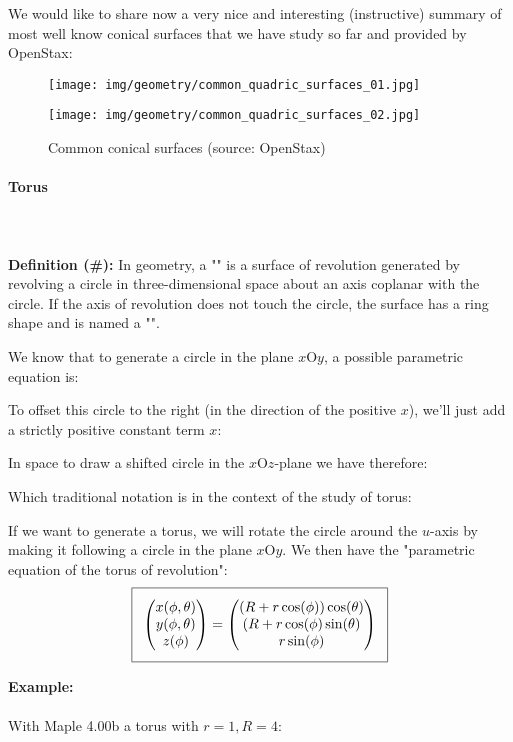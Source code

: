 {	We would like to share now a very nice and interesting (instructive) summary of most well know conical surfaces that we have study so far and provided by OpenStax:
	\begin{figure}[H]
		\centering
		\texttt{[image: img/geometry/common\_quadric\_surfaces\_01.jpg]}
	\end{figure}
	\begin{figure}[H]
		\centering
		\texttt{[image: img/geometry/common\_quadric\_surfaces\_02.jpg]}
		\caption[Common conical surfaces]{Common conical surfaces (source: OpenStax)}
	\end{figure}
	\pagebreak
	\paragraph{Torus}\mbox{}\\\\
	\textbf{Definition (\#\mydef):} In geometry, a "\label{torus}" is a surface of revolution generated by revolving a circle in three-dimensional space about an axis coplanar with the circle. If the axis of revolution does not touch the circle, the surface has a ring shape and is named a "".
	
	We know that to generate a circle in the plane $x\text{O}y$, a possible parametric equation is:
	
	To offset this circle to the right (in the direction of the positive $x$), we'll just add a strictly positive constant term $x$:
	
	In space to draw a shifted circle in the $x\text{O}z$-plane we have therefore:
	
	Which traditional notation is in the context of the study of torus:
	
	If we want to generate a torus, we will rotate the circle around the $u$-axis by making it following a circle in the plane $x\text{O}y$. We then have the  "parametric equation of the torus of revolution":
	\begin{equation}
	  \addtolength{\fboxsep}{5pt}
	   \boxed{
	   \begin{gathered}
	   		\begin{pmatrix}
	   		x(\phi,\theta)\\y(\phi,\theta)\\z(\phi)
	   		\end{pmatrix}=
	   		\begin{pmatrix}
	   		(R+r\cos(\phi))\cos(\theta)\\(R+r\cos(\phi)\sin(\theta)\\r\sin(\phi)
	   		\end{pmatrix}
	   \end{gathered}
	   }
	\end{equation}
	\begin{tcolorbox}[colframe=black,colback=white,sharp corners]
	\textbf{{\Large {}}Example:}\\\\
	With Maple 4.00b a torus with $r=1,R=4$:\\


\end{tcolorbox}}
